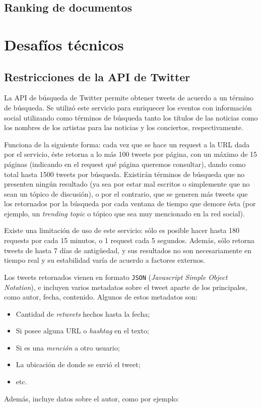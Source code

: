 \documentclass[upright, contnum]{umemoria}
\begin{document}
\subsection{Ranking de documentos}
\label{sec-1.2.3}


\section{Desafíos técnicos}
\label{sec-1.3}

\subsection{Restricciones de la API de Twitter}
\label{sec-1.3.1}


   La API de búsqueda de Twitter permite obtener tweets de acuerdo a un
   término de búsqueda. Se utilizó este servicio para enriquecer los
   eventos con información social utilizando como términos de búsqueda
   tanto los títulos de las noticias como los nombres de los artistas
   para las noticias y los conciertos, respectivamente. 
   
   Funciona de la siguiente forma: cada vez que se hace un request a la
   URL dada por el servicio, éste retorna a lo más 100 tweets por página, con un
   máximo de 15 páginas (indicando en el request qué página queremos
   consultar), dando como total hasta 1500 tweets por búsqueda. Existirán
   términos de búsqueda que no presenten ningún resultado  (ya sea por
   estar mal escritos o simplemente que no sean un tópico de discusión), o por
   el contrario, que se generen más tweets que los retornados por la
   búsqueda por cada ventana de tiempo que demore ésta (por ejemplo, un
   \emph{trending topic} o tópico que sea muy mencionado en la red social).
   
   Existe una limitación de uso de este servicio: sólo es posible hacer
   hasta 180 requests por cada 15 minutos, o 1 request cada 5
   segundos. Además, sólo retorna tweets de hasta 7 días de antigüedad, y
   sus resultados no son necesariamente en tiempo real y su estabilidad
   varía de acuerdo a factores externos.
   
   Los tweets retornados vienen en formato \texttt{JSON} (\emph{Javascript Simple Object Notation}),
   e incluyen varios metadatos sobre el tweet aparte de los principales,
   como autor, fecha, contenido. Algunos de estos metadatos son:
   
\begin{itemize}
\item Cantidad de \emph{retweets} hechos hasta la fecha;
\item Si posee alguna URL o \emph{hashtag} en el texto;
\item Si es una \emph{mención} a otro usuario;
\item La ubicación de donde se envió el tweet;
\item etc.
\end{itemize}
  Además, incluye datos sobre el autor, como por ejemplo:
\end{document}
